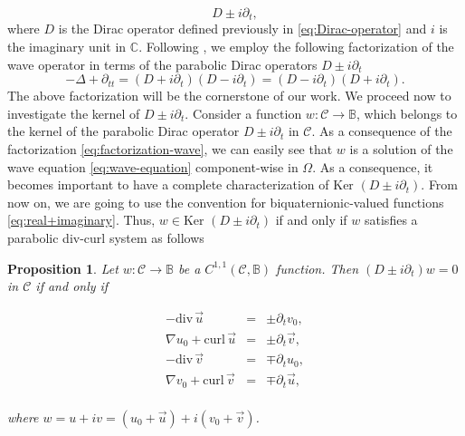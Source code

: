 \documentclass[12pt]{article}
\newtheorem{proposition}[theorem]{Proposition}
\def\C{\mathbb{C}}
\def\div{\mbox{div}\,}
\def\curl{\mbox{curl}\,}
\def\B{\mathbb{B}}
\def\C{\mathbb{C}}
\begin{document}
\begin{equation}\label{eq:parabolic-Dirac}
    D\pm i\partial_t,
\end{equation}
where $D$ is the Dirac operator defined previously in \eqref{eq:Dirac-operator} and $i$ is the imaginary unit in $\C$. Following \cite{kravchenko1998kernel, kravchenko2003applied}, we employ the following factorization of the wave operator in terms of the parabolic Dirac operators $D\pm i\partial_t$
\begin{equation}\label{eq:factorization-wave}
        -\Delta+\partial_{tt}=(D+i\partial_t)(D-i\partial_t)=(D-i\partial_t)(D+i\partial_t).
\end{equation}
The above factorization will be the cornerstone of our work. We proceed now to investigate the kernel of $D\pm i\partial_t$. Consider a function $w:\mathscr{C}\to \B$, which belongs to the kernel of the parabolic Dirac operator $D\pm i\partial_t$ in $\mathscr{C}$. As a consequence of the factorization \eqref{eq:factorization-wave}, we can easily see that $w$ is a solution of the wave equation \eqref{eq:wave-equation} component-wise in $\Omega$. As a consequence, it becomes important to have a complete characterization of $\text{Ker }(D\pm i\partial_t)$. From now on, we are going to use the convention for biquaternionic-valued functions \eqref{eq:real+imaginary}. Thus, $w\in \text{Ker }(D\pm i\partial_t)$ if and only if $w$ satisfies a parabolic div-curl system as follows

\begin{proposition}\label{equivalent:system:proposition}
    Let $w:\mathscr{C}\to\B$ be a $C^{1,1}(\mathscr{C},\mathbb{B})$ function. Then $(D\pm i\partial_t)w=0$ in $\mathscr{C}$ if and only if
    
    \begin{equation}\label{eq:div-curl-parabolic}
        \begin{array}{rlc}
                -\div \vec{u}&=&\pm\partial_t v_0,\\
                \nabla u_0+\curl \vec{u}&=&\pm\partial_t\vec{v},\\
                -\div \vec{v}&=&\mp\partial_t u_0,\\
                \nabla v_0+\curl \vec{v}&=&\mp\partial_t\vec{u},\\
        \end{array}
    \end{equation}
    
    where $w=u+iv=(u_0+\vec{u})+i(v_0+\vec{v})$.
\end{proposition}
\end{document}
